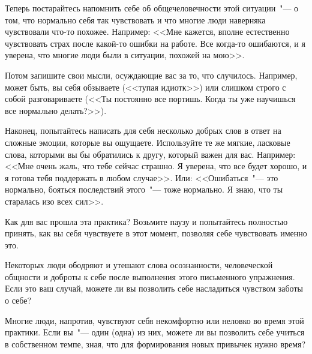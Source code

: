 \vfill


\newpage


Теперь постарайтесь напомнить себе об общечеловечности этой ситуации~"--- о том, что нормально себя так чувствовать и что многие люди наверняка чувствовали что-то похожее. Например: <<Мне кажется, вполне естественно чувствовать страх после какой-то ошибки на работе. Все когда-то ошибаются, и я уверена, что многие люди были в ситуации, похожей на мою>>.

\vfill

Потом запишите свои мысли, осуждающие вас за то, что случилось. Например, может быть, вы себя обзываете (<<тупая идиотк>>) или слишком строго с собой разговариваете (<<Ты постоянно все портишь. Когда ты уже научишься все нормально делать?>>).

\vfill


\newpage


Наконец, попытайтесь написать для себя несколько добрых слов в ответ на сложные эмоции, которые вы ощущаете. Используйте те же мягкие, ласковые слова, которыми вы бы обратились к другу, который важен для вас. Например: <<Мне очень жаль, что тебе сейчас страшно. Я уверена, что все будет хорошо, и я готова тебя поддержать в любом случае>>. Или: <<Ошибаться~"--- это нормально, бояться последствий этого~"--- тоже нормально. Я знаю, что ты старалась изо всех сил>>.

\vfill


\vspace{3ex}

Как для вас прошла эта практика? Возьмите паузу и попытайтесь полностью принять, как вы себя чувствуете в этот момент, позволяя себе чувствовать именно это. 

Некоторых люди ободряют и утешают слова осознанности, человеческой общности и доброты к себе после выполнения этого письменного упражнения. Если это ваш случай, можете ли вы позволить себе насладиться чувством заботы о себе?

Многие люди, напротив, чувствуют себя некомфортно или неловко во время этой практики. Если вы~"--- один (одна) из них, можете ли вы позволить себе учиться в собственном темпе, зная, что для формирования новых привычек нужно время?


